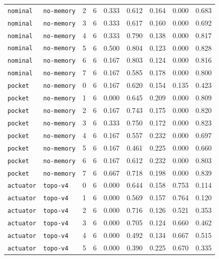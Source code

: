 \documentclass{article}
\begin{document}
\begin{center}
\begin{tabular}{lllcccccc}
\texttt{nominal} & \texttt{no-memory} & 2 & 6 & 0.333 & 0.612 & 0.164 & 0.000 & 0.683 \\
\texttt{nominal} & \texttt{no-memory} & 3 & 6 & 0.333 & 0.617 & 0.160 & 0.000 & 0.692 \\
\texttt{nominal} & \texttt{no-memory} & 4 & 6 & 0.333 & 0.790 & 0.138 & 0.000 & 0.817 \\
\texttt{nominal} & \texttt{no-memory} & 5 & 6 & 0.500 & 0.804 & 0.123 & 0.000 & 0.828 \\
\texttt{nominal} & \texttt{no-memory} & 6 & 6 & 0.167 & 0.803 & 0.124 & 0.000 & 0.816 \\
\texttt{nominal} & \texttt{no-memory} & 7 & 6 & 0.167 & 0.585 & 0.178 & 0.000 & 0.800 \\
\texttt{pocket} & \texttt{no-memory} & 0 & 6 & 0.167 & 0.620 & 0.154 & 0.135 & 0.423 \\
\texttt{pocket} & \texttt{no-memory} & 1 & 6 & 0.000 & 0.645 & 0.209 & 0.000 & 0.809 \\
\texttt{pocket} & \texttt{no-memory} & 2 & 6 & 0.167 & 0.743 & 0.175 & 0.000 & 0.820 \\
\texttt{pocket} & \texttt{no-memory} & 3 & 6 & 0.333 & 0.750 & 0.172 & 0.000 & 0.823 \\
\texttt{pocket} & \texttt{no-memory} & 4 & 6 & 0.167 & 0.557 & 0.232 & 0.000 & 0.697 \\
\texttt{pocket} & \texttt{no-memory} & 5 & 6 & 0.167 & 0.461 & 0.225 & 0.000 & 0.660 \\
\texttt{pocket} & \texttt{no-memory} & 6 & 6 & 0.167 & 0.612 & 0.232 & 0.000 & 0.803 \\
\texttt{pocket} & \texttt{no-memory} & 7 & 6 & 0.667 & 0.718 & 0.198 & 0.000 & 0.839 \\
\texttt{actuator} & \texttt{topo-v4} & 0 & 6 & 0.000 & 0.644 & 0.158 & 0.753 & 0.114 \\
\texttt{actuator} & \texttt{topo-v4} & 1 & 6 & 0.000 & 0.569 & 0.157 & 0.764 & 0.120 \\
\texttt{actuator} & \texttt{topo-v4} & 2 & 6 & 0.000 & 0.716 & 0.126 & 0.521 & 0.353 \\
\texttt{actuator} & \texttt{topo-v4} & 3 & 6 & 0.000 & 0.705 & 0.124 & 0.660 & 0.462 \\
\texttt{actuator} & \texttt{topo-v4} & 4 & 6 & 0.000 & 0.492 & 0.134 & 0.667 & 0.515 \\
\texttt{actuator} & \texttt{topo-v4} & 5 & 6 & 0.000 & 0.390 & 0.225 & 0.670 & 0.335 \\
\bottomrule
\end{tabular}
\end{center}
\end{document}

